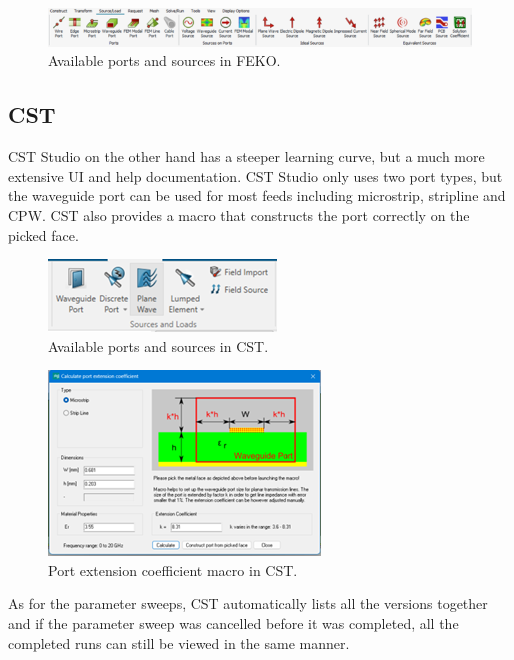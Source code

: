     \begin{figure}[H]
    \centering
    \includegraphics[width=0.95\linewidth]{Figures/chp2_FEKO_ports.png}
    \caption{Available ports and sources in FEKO.}
    \label{fig:chp2_FEKO_ports}
    \end{figure}

\subsection{CST}
CST Studio on the other hand has a steeper learning curve, but a much more extensive UI and help documentation. CST Studio only uses two port types, but the waveguide port can be used for most feeds including microstrip, stripline and CPW. CST also provides a macro that constructs the port correctly on the picked face.

    \begin{figure}[H]
    \centering
    \includegraphics[width=0.4\linewidth]{Figures/chp2_CST_ports.png}
    \caption{Available ports and sources in CST.}
    \label{fig:chp2_CST_ports}
    \end{figure}

    \begin{figure}[H]
    \centering
    \includegraphics[width=0.55\linewidth]{Figures/chp2_CST_coefficient_calculator.png}
    \caption{Port extension coefficient macro in CST.}
    \label{fig:chp2_CST_coefficient_calculator}
    \end{figure}

As for the parameter sweeps, CST automatically lists all the versions together and if the parameter sweep was cancelled before it was completed, all the completed runs can still be viewed in the same manner.

